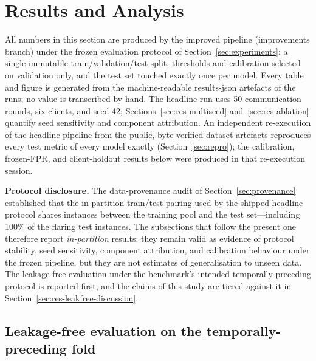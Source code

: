 \section{Results and Analysis}\label{sec:results}

All numbers in this section are produced by the improved pipeline
(improvements branch) under the frozen evaluation protocol of
Section~\ref{sec:experiments}: a single immutable
train/validation/test split, thresholds and calibration selected on
validation only, and the test set touched exactly once per model. Every
table and figure is generated from the machine-readable
results-json artefacts of the runs; no value is transcribed by
hand. The headline run uses 50 communication rounds, six clients, and
seed 42; Sections~\ref{sec:res-multiseed} and~\ref{sec:res-ablation}
quantify seed sensitivity and component attribution. An independent
re-execution of the headline pipeline from the public, byte-verified
dataset artefacts reproduces every test metric of every model exactly
(Section~\ref{sec:repro}); the calibration, frozen-FPR, and
client-holdout results below were produced in that re-execution
session.

\textbf{Protocol disclosure.} The data-provenance audit of
Section~\ref{sec:provenance} established that the in-partition
train/test pairing used by the shipped headline protocol shares
instances between the training pool and the test set---including
100\% of the flaring test instances. The subsections that follow the
present one therefore report \emph{in-partition} results: they remain
valid as evidence of protocol stability, seed sensitivity, component
attribution, and calibration behaviour under the frozen pipeline, but
they are not estimates of generalisation to unseen data. The
leakage-free evaluation under the benchmark's intended
temporally-preceding protocol is reported first, and the claims of
this study are tiered against it in
Section~\ref{sec:res-leakfree-discussion}.

\subsection{Leakage-free evaluation on the temporally-preceding fold}
\label{sec:res-leakfree}

